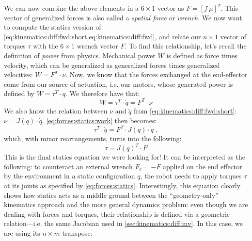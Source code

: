 We can now combine the above elements in a $6\times1$ vector as $F=[f \ \mu]^T$.
This vector of generalized forces is also called a \textsl{spatial force} or \textsl{wrench}.
We now want to compute the statics version of \cref{eq:kinematics:diff:fwd:short,eq:kinematics:diff:fwd}, and relate our $n \times 1$ vector of torques $\tau$ with the $6\times1$ wrench vector $F$.
To find this relationship, let's recall the definition of \textsl{power} from physics. Mechanical power $W$ is defined as force times velocity, which can be generalized as generalized forces times generalized velocities: $W=F^T \cdot \nu$.
Now, we know that the forces exchanged at the end-effector come from our source of actuation, i.e. our motors, whose generated power is defined by $W=\tau ^T \cdot \dot{q}$. We therefore have that:
\begin{equation}\label{eq:forces:statics:work}
W=\tau ^T \cdot \dot{q} = F^T  \cdot \nu
\end{equation}
We also know the relation between $\nu$ and $\dot{q}$ from \cref{eq:kinematics:diff:fwd:short}: $\nu =J(q) \cdot \dot{q}$. \cref{eq:forces:statics:work} then becomes:
\begin{equation}
\tau ^T \cdot \dot{q} = F^T  \cdot J(q) \cdot \dot{q} \ ,
\end{equation}
which, with minor rearrangements, turns into the following:
\begin{equation}\label{eq:forces:statics}
\tau = J(q) ^T \cdot F
\end{equation}
This is the final statics equation we were looking for!
It can be interpreted as the following: to counteract an external wrench $F_e = -F$ applied on the end effector by the environment in a static configuration $q$, the robot needs to apply torques $\tau$ at its joints as specified by \cref{eq:forces:statics}.
Interestingly, this equation clearly shows how statics acts as a middle ground between the ``geometry-only'' kinematics approach and the more general dynamics problem: even though we are dealing with forces and torques, their relationship is defined via a geometric relation---i.e. the same Jacobian used in \cref{sec:kinematics:diff:inv}. In this case, we are using its $n\times m$ transpose:

